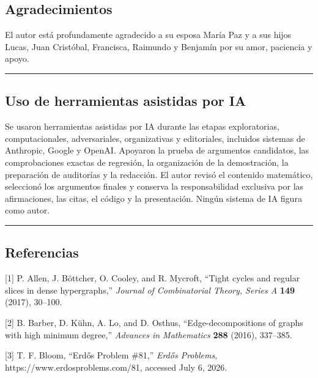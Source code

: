 \documentclass[
  spanish,
  11pt,
  a4paper,
]{article}
\begin{document}
\subsection{Agradecimientos}\label{agradecimientos}

El autor está profundamente agradecido a su esposa María Paz y a sus hijos Lucas, Juan Cristóbal, Francisca, Raimundo y Benjamín por su amor, paciencia y apoyo.

\begin{center}\rule{0.5\linewidth}{0.5pt}\end{center}

\subsection{Uso de herramientas asistidas por IA}\label{uso-de-herramientas-asistidas-por-ia}

Se usaron herramientas asistidas por IA durante las etapas exploratorias, computacionales, adversariales, organizativas y editoriales, incluidos sistemas de Anthropic, Google y OpenAI. Apoyaron la prueba de argumentos candidatos, las comprobaciones exactas de regresión, la organización de la demostración, la preparación de auditorías y la redacción. El autor revisó el contenido matemático, seleccionó los argumentos finales y conserva la responsabilidad exclusiva por las afirmaciones, las citas, el código y la presentación. Ningún sistema de IA figura como autor.

\begin{center}\rule{0.5\linewidth}{0.5pt}\end{center}

\begingroup
\setlength{\parskip}{2pt plus 1pt minus 1pt}
\subsection{Referencias}\label{referencias}

{[}1{]} P. Allen, J. Böttcher, O. Cooley, and R. Mycroft, ``Tight cycles and regular slices in dense hypergraphs,'' \emph{Journal of Combinatorial Theory, Series A} \textbf{149} (2017), 30--100.

{[}2{]} B. Barber, D. Kühn, A. Lo, and D. Osthus, ``Edge-decompositions of graphs with high minimum degree,'' \emph{Advances in Mathematics} \textbf{288} (2016), 337--385.

{[}3{]} T. F. Bloom, ``Erdős Problem \#81,'' \emph{Erdős Problems}, https://www.erdosproblems.com/81, accessed July 6, 2026.
\end{document}
